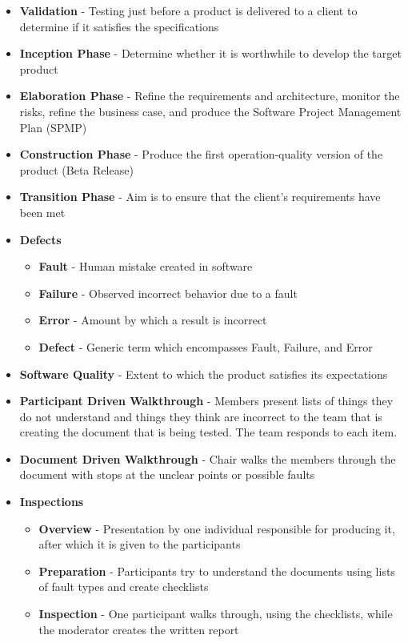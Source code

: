 \documentclass{report}
\begin{document}
\begin{itemize}
		\item \textbf{Validation} - Testing just before a product is delivered to a client to determine if it satisfies the specifications
		\item \textbf{Inception Phase} - Determine whether it is worthwhile to develop the target product
		\item \textbf{Elaboration Phase} - Refine the requirements and architecture, monitor the risks, refine the business case, and produce the Software Project Management Plan (SPMP)
		\item \textbf{Construction Phase} - Produce the first operation-quality version of the product (Beta Release)
		\item \textbf{Transition Phase} - Aim is to ensure that the client's requirements have been met
		\item \textbf{Defects}
			\begin{itemize}
				\item \textbf{Fault} - Human mistake created in software
				\item \textbf{Failure} - Observed incorrect behavior due to a fault
				\item \textbf{Error} - Amount by which a result is incorrect
				\item \textbf{Defect} - Generic term which encompasses Fault, Failure, and Error
			\end{itemize}
		\item \textbf{Software Quality} - Extent to which the product satisfies its expectations
		\item \textbf{Participant Driven Walkthrough} - Members present lists of things they do not understand and things they think are incorrect to the team that is creating the document that is being tested. The team responds to each item.
		\item \textbf{Document Driven Walkthrough} - Chair walks the members through the document with stops at the unclear points or possible faults
		\item \textbf{Inspections}
			\begin{itemize}
				\item \textbf{Overview} - Presentation by one individual responsible for producing it, after which it is given to the participants
				\item \textbf{Preparation} - Participants try to understand the documents using lists of fault types and create checklists
				\item \textbf{Inspection} - One participant walks through, using the checklists, while the moderator creates the written report

\end{itemize}
\end{itemize}
\end{document}
